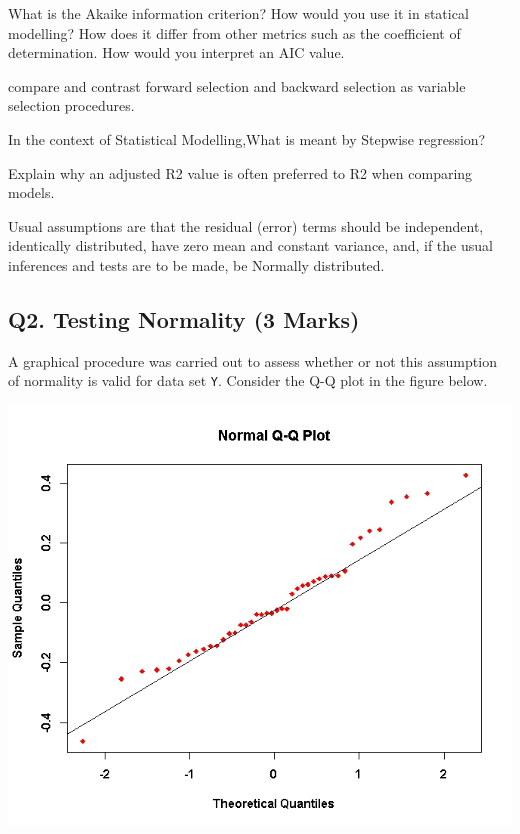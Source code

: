 \documentclass[a4paper,12pt]{article}
\begin{document}
What is the Akaike information criterion? How would you use it in statical modelling? How does it differ from other metrics such as the 
coefficient of determination. How would you interpret an AIC value.

compare and contrast forward selection and backward selection as variable selection procedures.

In the context of Statistical Modelling,What is meant by Stepwise regression?

Explain why an adjusted R2 value is often preferred to R2
when comparing
models. 




Usual assumptions are that the residual (error) terms should be independent,
identically distributed, have zero mean and constant variance, and, if the usual
inferences and tests are to be made, be Normally distributed. 


\newpage



\subsection*{Q2. Testing Normality (3 Marks)} %
A graphical procedure was carried out to assess whether or not this assumption of normality is valid for data set \texttt{Y}. Consider the Q-Q plot in the figure below.

\begin{center}
	\includegraphics[scale=0.45]{images/ExamQ5qqplot}
\end{center}
\end{document}
